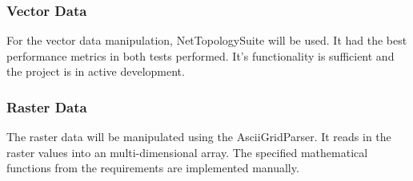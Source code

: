\subsubsection{Vector Data}
For the vector data manipulation, NetTopologySuite will be used. It had the best performance metrics in both tests performed. It's functionality is sufficient and the project is in active development.

\subsubsection{Raster Data}
The raster data will be manipulated using the AsciiGridParser. It reads in the raster values into an multi-dimensional array. The specified mathematical functions from the requirements are implemented manually.
